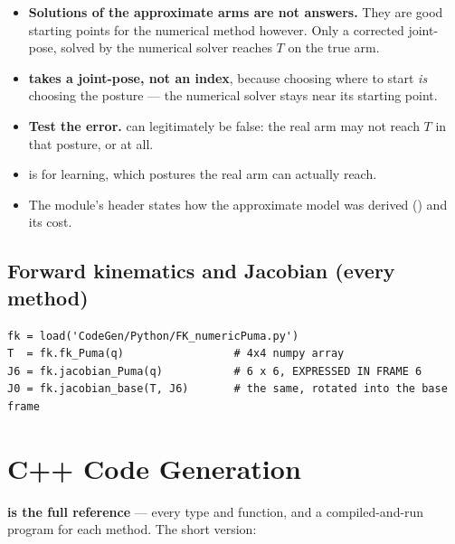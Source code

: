 \documentclass[11pt]{article}
\begin{document}
\begin{itemize}
\item \textbf{Solutions of the  approximate arms are not answers.}
They are good starting points for the numerical method however.
Only a corrected joint-pose, solved by the numerical solver
  reaches $T$ on the true arm.
\item \textbf{ takes a joint-pose, not an index}, because
  choosing where to start \emph{is} choosing the posture --- the numerical solver stays
  near its starting point.
\item \textbf{Test the error.}   can legitimately be false:  the
  real arm may not reach $T$ in that posture, or at all.
\item {} is for learning,   which postures the real arm can
  actually reach.
\item The module's header states how the approximate model was derived
() and its
  cost.
\end{itemize}

\subsection{Forward kinematics and Jacobian (every method)}

\begin{lstlisting}
fk = load('CodeGen/Python/FK_numericPuma.py')
T  = fk.fk_Puma(q)                 # 4x4 numpy array
J6 = fk.jacobian_Puma(q)           # 6 x 6, EXPRESSED IN FRAME 6
J0 = fk.jacobian_base(T, J6)       # the same, rotated into the base frame
\end{lstlisting}


\section{C++ Code Generation}

\textbf{ is the full reference} --- every type and
function, and a compiled-and-run program for each method.  The short version:
\end{document}
